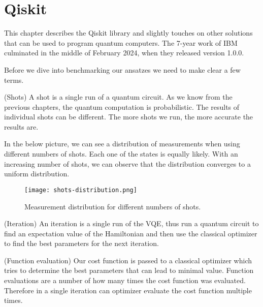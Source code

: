 \chapter{Qiskit}\label{ch:qiskit}
This chapter describes the Qiskit library and slightly touches on other solutions that can be used to program quantum computers.
The 7-year work of IBM culminated in the middle of February 2024, when they released version 1.0.0.

Before we dive into benchmarking our ansatzes we need to make clear a few terms.
\begin{definition} (Shots) 
    A shot is a single run of a quantum circuit. As we know from the previous chapters, the quantum computation is probabilistic. The results of individual shots can be different. The more shots we run, the more accurate the results are.
\end{definition}

In the below picture, we can see a distribution of measurements when using different numbers of shots. Each one of the states is equally likely. With an increasing number of shots, we can observe that the distribution converges to a uniform distribution.

\begin{figure}[H]
    \centering
    \texttt{[image: shots-distribution.png]}
    \caption{Measurement distribution for different numbers of shots.}\label{fig:output}
\end{figure}

\begin{definition} (Iteration) 
    An iteration is a single run of the VQE, thus run a quantum circuit to find an expectation value of the Hamiltonian and then use the classical optimizer to find the best parameters for the next iteration.
\end{definition}

\begin{definition}(Function evaluation)
    Our cost function is passed to a classical optimizer which tries to determine the best parameters that can lead to minimal value. Function evaluations are a number of how many times the cost function was evaluated. Therefore in a single iteration can optimizer evaluate the cost function multiple times.
\end{definition}

